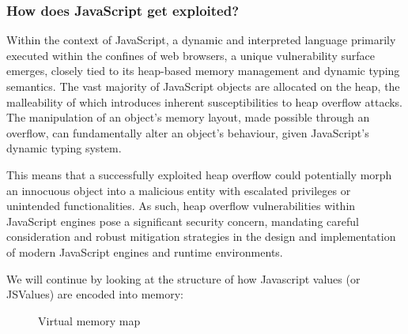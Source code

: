 \documentclass{article}
\begin{document}
\subsubsection{How does JavaScript get exploited?}
Within the context of JavaScript, a dynamic and interpreted language primarily
executed within the confines of web browsers, a unique vulnerability surface
emerges, closely tied to its heap-based memory management and dynamic typing
semantics. The vast majority of JavaScript objects are allocated on the heap,
the malleability of which introduces inherent susceptibilities to heap overflow
attacks. The manipulation of an object's memory layout, made possible through an
overflow, can fundamentally alter an object's behaviour, given JavaScript's
dynamic typing system.


This means that a successfully exploited heap overflow
could potentially morph an innocuous object into a malicious entity with
escalated privileges or unintended functionalities. As such, heap overflow
vulnerabilities within JavaScript engines pose a significant security concern,
mandating careful consideration and robust mitigation strategies in the design
and implementation of modern JavaScript engines and runtime environments.


We will continue by looking at the structure of how Javascript values (or
JSValues) are encoded into memory:

\begin{figure}[ht]%
  \centering
  \caption{\label{fig:label} Virtual memory map}%
  \label{fig:stackframe}
\end{figure}
\end{document}
